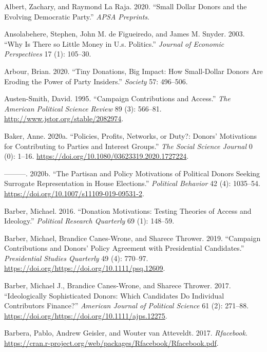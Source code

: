 \documentclass[12pt,]{article}
\begin{document}
\leavevmode\hypertarget{ref-albert2020}{}%
Albert, Zachary, and Raymond La Raja. 2020. ``Small Dollar Donors and
the Evolving Democratic Party.'' \emph{APSA Preprints}.

\leavevmode\hypertarget{ref-ansolabehere2003}{}%
Ansolabehere, Stephen, John M. de Figueiredo, and James M. Snyder. 2003.
``Why Is There so Little Money in U.s. Politics.'' \emph{Journal of
Economic Perspectives} 17 (1): 105--30.

\leavevmode\hypertarget{ref-arbour2020}{}%
Arbour, Brian. 2020. ``Tiny Donations, Big Impact: How Small-Dollar
Donors Are Eroding the Power of Party Insiders.'' \emph{Society} 57:
496--506.

\leavevmode\hypertarget{ref-austensmith1995}{}%
Austen-Smith, David. 1995. ``Campaign Contributions and Access.''
\emph{The American Political Science Review} 89 (3): 566--81.
\url{http://www.jstor.org/stable/2082974}.

\leavevmode\hypertarget{ref-baker2020a}{}%
Baker, Anne. 2020a. ``Policies, Profits, Networks, or Duty?: Donors'
Motivations for Contributing to Parties and Interest Groups.'' \emph{The
Social Science Journal} 0 (0): 1--16.
\url{https://doi.org/10.1080/03623319.2020.1727224}.

\leavevmode\hypertarget{ref-baker2020b}{}%
---------. 2020b. ``The Partisan and Policy Motivations of Political
Donors Seeking Surrogate Representation in House Elections.''
\emph{Political Behavior} 42 (4): 1035--54.
\url{https://doi.org/10.1007/s11109-019-09531-2}.

\leavevmode\hypertarget{ref-barber2016a}{}%
Barber, Michael. 2016. ``Donation Motivations: Testing Theories of
Access and Ideology.'' \emph{Political Research Quarterly} 69 (1):
148--59.

\leavevmode\hypertarget{ref-barber2019}{}%
Barber, Michael, Brandice Canes-Wrone, and Sharece Thrower. 2019.
``Campaign Contributions and Donors' Policy Agreement with Presidential
Candidates.'' \emph{Presidential Studies Quarterly} 49 (4): 770--97.
\url{https://doi.org/https://doi.org/10.1111/psq.12609}.

\leavevmode\hypertarget{ref-barber2017}{}%
Barber, Michael J., Brandice Canes-Wrone, and Sharece Thrower. 2017.
``Ideologically Sophisticated Donors: Which Candidates Do Individual
Contributors Finance?'' \emph{American Journal of Political Science} 61
(2): 271--88. \url{https://doi.org/https://doi.org/10.1111/ajps.12275}.

\leavevmode\hypertarget{ref-rfacebook}{}%
Barbera, Pablo, Andrew Geisler, and Wouter van Atteveldt. 2017.
\emph{Rfacebook}.
\url{https://cran.r-project.org/web/packages/Rfacebook/Rfacebook.pdf}.
\end{document}
